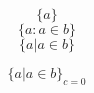 \documentclass{article}
\begin{document}
\[ \{ a \} \]
\[ \{ a : a\in b \} \]
\[ \{ a | a\in b \} \]

\[ \{ a | a\in b \}_{c=0} \]
\end{document}
